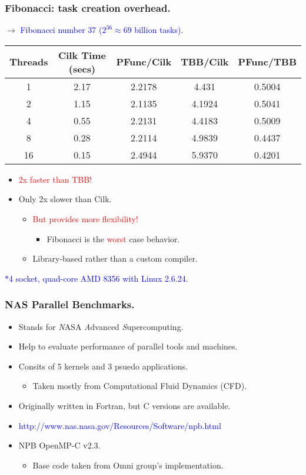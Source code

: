 \documentclass{beamer}
\newcommand{\tablefont}{\fontsize{8}{13}\selectfont}
\begin{document}
\begin{frame}[fragile]
\frametitle{Fibonacci: task creation overhead.}
$\rightarrow{}$ \textcolor{blue}{Fibonacci number 37 ($2^{36}\approx{}69$ billion tasks).}
\tablefont
\begin{center}
\begin{tabular}{|c|c|c|c|c|} 
\hline
Threads & Cilk Time (secs) & PFunc/Cilk & TBB/Cilk & PFunc/TBB \\
\hline
1  & 2.17 & 2.2178  & 4.431 & 0.5004 \\ 
\hline
2  & 1.15 & 2.1135 & 4.1924 & 0.5041 \\ 
\hline
4  & 0.55 & 2.2131 & 4.4183 & 0.5009 \\ 
\hline
8  & 0.28 & 2.2114 & 4.9839 & 0.4437 \\ 
\hline
16 & 0.15 & 2.4944 & 5.9370 & 0.4201 \\ 
\hline
\end{tabular}
\end{center}
\normalsize
\begin{itemize}
\item \textcolor{red}{2x faster than TBB!}
\item Only 2x slower than Cilk.
  \begin{itemize}
  \item \textcolor{red}{But provides more flexibility!}
    \begin{itemize}
    \item Fibonacci is the \textcolor{red}{worst} case behavior.
    \end{itemize}
  \item Library-based rather than a custom compiler.
  \end{itemize}
\end{itemize}
\tiny\textcolor{blue}{$\ast{}$4 socket, quad-core AMD 8356 with Linux 2.6.24.}\normalsize
\end{frame}

\begin{frame}
\frametitle{NAS Parallel Benchmarks.}
  \begin{itemize}
  \item Stands for \textit{N}ASA \textit{A}dvanced \textit{S}upercomputing.
  \item Help to evaluate performance of parallel tools and machines.
  \item Consits of 5 kernels and 3 psuedo applications.
    \begin{itemize}
    \item Taken mostly from Computational Fluid Dynamics (CFD).
    \end{itemize}
  \item Originally written in Fortran, but C versions are available.
  \item \textcolor{blue}{http://www.nas.nasa.gov/Resources/Software/npb.html}
  \item NPB OpenMP-C v2.3.
    \begin{itemize}
    \item Base code taken from Omni group's implementation.
    \end{itemize}
\end{itemize}
\end{frame}
\end{document}
